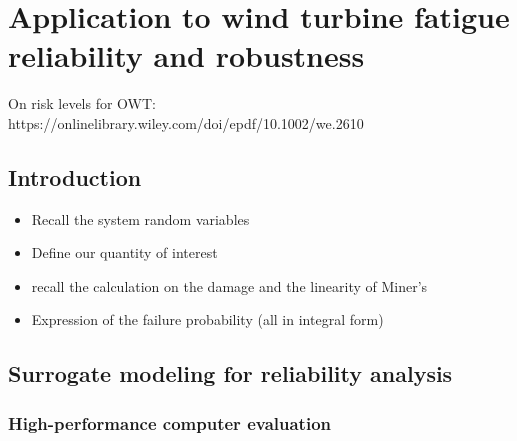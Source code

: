 \cleardoublepage
\chapter{Application to wind turbine fatigue reliability and robustness}
\label{chpt:7}
\hfill
\localtableofcontents
\newpage

On risk levels for OWT: https://onlinelibrary.wiley.com/doi/epdf/10.1002/we.2610


\section{Introduction}
\begin{itemize}
    \item Recall the system random variables
    \item Define our quantity of interest
    \item recall the calculation on the damage and the linearity of Miner's 
    \item Expression of the failure probability (all in integral form)
\end{itemize}




\section{Surrogate modeling for reliability analysis}

\subsection{High-performance computer evaluation}

